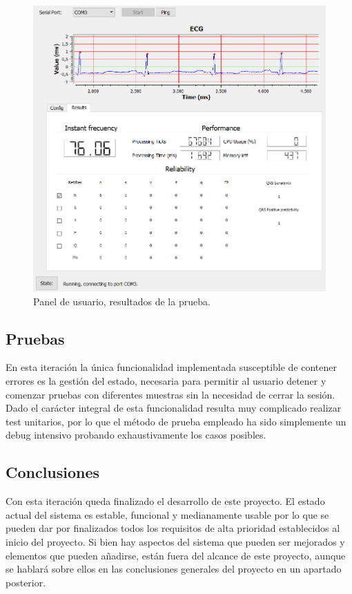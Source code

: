         \begin{figure}[H]
            \centering
                    \includegraphics[width = \linewidth]{figuras/Results.PNG}
            \caption{Panel de usuario, resultados de la prueba.}
            \label{fig:EndResults}
        \end{figure}
       
    \subsection{Pruebas}
    
    En esta iteración la única funcionalidad implementada susceptible de contener errores es la gestión del estado, necesaria para permitir al usuario detener y comenzar pruebas con diferentes muestras sin la necesidad de cerrar la sesión. Dado el carácter integral de esta funcionalidad resulta muy complicado realizar test unitarios, por lo que el método de prueba empleado ha sido simplemente un debug intensivo probando exhaustivamente los casos posibles.
    
    \subsection{Conclusiones}
    
    Con esta iteración queda finalizado el desarrollo de este proyecto. El estado actual del sistema es estable, funcional y medianamente usable por lo que se pueden dar por finalizados todos los requisitos de alta prioridad establecidos al inicio del proyecto. Si bien hay aspectos del sistema que pueden ser mejorados y elementos que pueden añadirse, están fuera del alcance de este proyecto, aunque se hablará sobre ellos en las conclusiones generales del proyecto en un apartado posterior.